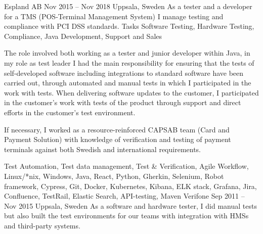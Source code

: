 \documentclass{sobCV}[2015/09/08]
\begin{document}
   {Espland AB}
   {Nov 2015 -- Nov 2018}
   {Uppsala, Sweden}{
       As a tester and a developer for a TMS (POS-Terminal Management System) I
       manage testing and compliance with PCI DSS standards.
   }
   {Tasks}{
       Software Testing,
       Hardware Testing,
       Compliance, 
       Java Development,
       Support and Sales
 }{  %
      {
          The role involved both working as a tester and junior developer within
          Java, in my role as test leader I had the main responsibility for
          ensuring that the tests of self-developed software including
          integrations to standard software have been carried out, through
          automated and manual tests in which I participated in the work with
          tests.  When delivering software updates to the customer, I
          participated in the customer's work with tests of the product through
          support and direct efforts in the customer's test environment.  

          If necessary, I worked as a  resource-reinforced CAPSAB team (Card
          and Payment Solution) with knowledge of verification and testing of
          payment terminals against both Swedish and international
          requirements.
     }
 }{
       Test Automation,
       Test data management,
       Test \& Verification,
       Agile Workflow, 
       Linux/*nix, 
       Windows, 
       Java, 
       React, 
       Python, 
       Gherkin, 
       Selenium, 
       Robot framework,
       Cypress, 
       Git, 
       Docker, 
       Kubernetes, 
       Kibana, 
       ELK stack, 
       Grafana, 
       Jira, 
       Confluence, 
       TestRail, 
       Elastic Search, 
       API-testing, 
       Maven 
}
   {Verifone}
   {Sep 2011 -- Nov 2015}
   {Uppsala, Sweden}{
       As a software and hardware tester, I did manual tests but also built the
       test environments for our teams with integration with HMSs and
       third-party systems.
   }
\end{document}
